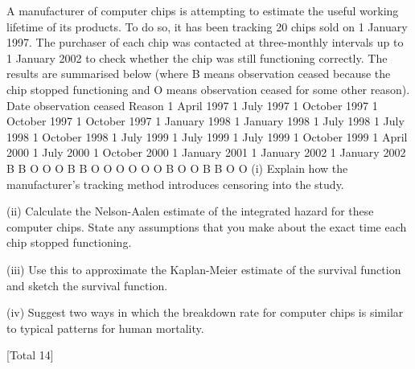 \documentclass[a4paper,12pt]{article}
\begin{document}
A manufacturer of computer chips is attempting to estimate the useful working
lifetime of its products. To do so, it has been tracking 20 chips sold on 1 January
1997. The purchaser of each chip was contacted at three-monthly intervals up to
1 January 2002 to check whether the chip was still functioning correctly. The results
are summarised below (where B means observation ceased because the chip stopped
functioning and O means observation ceased for some other reason).
Date observation ceased Reason
1 April 1997
1 July 1997
1 October 1997
1 October 1997
1 October 1997
1 January 1998
1 January 1998
1 July 1998
1 July 1998
1 October 1998
1 July 1999
1 July 1999
1 July 1999
1 October 1999
1 April 2000
1 July 2000
1 October 2000
1 January 2001
1 January 2002
1 January 2002 B
B
O
O
O
B
B
O
O
O
O
O
O
B
O
O
B
B
O
O
(i) Explain how the manufacturer’s tracking method introduces censoring into the
study.

(ii) Calculate the Nelson-Aalen estimate of the integrated hazard for these
computer chips. State any assumptions that you make about the exact time
each chip stopped functioning.

(iii) Use this to approximate the Kaplan-Meier estimate of the survival function
and sketch the survival function.

(iv) Suggest two ways in which the breakdown rate for computer chips is similar
to typical patterns for human mortality.

[Total 14]
\end{document}
